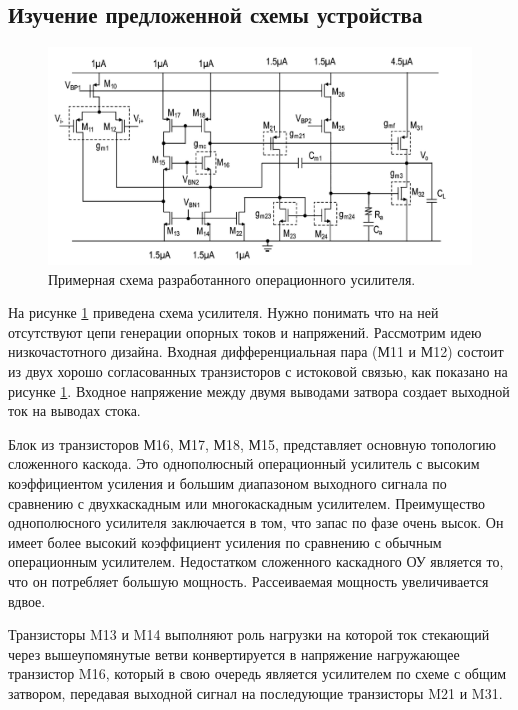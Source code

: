 \documentclass[a4paper,12pt]{article} %
\begin{document}



\subsection{Изучение предложенной схемы устройства}

\begin{figure}[]
    \centering
    \includegraphics[width=\textwidth]{opamp/sch.png}
    \caption{Примерная схема разработанного операционного усилителя.}
    \label{pic:op_amp}
\end{figure}


На рисунке \ref{pic:op_amp} приведена схема усилителя. Нужно понимать что на ней  отсутствуют цепи генерации опорных токов и напряжений. Рассмотрим идею низкочастотного дизайна.
Входная дифференциальная  пара (М11 и М12) состоит из двух хорошо согласованных транзисторов с истоковой связью, как показано на рисунке \ref{pic:op_amp}. Входное напряжение между двумя выводами затвора создает выходной ток на выводах стока. 

Блок из транзисторов М16, М17, М18, М15, представляет основную топологию сложенного каскода. Это однополюсный операционный усилитель с высоким коэффициентом усиления и большим диапазоном выходного сигнала по сравнению с двухкаскадным или многокаскадным усилителем. Преимущество однополюсного усилителя заключается в том, что запас по фазе очень высок. Он имеет более высокий коэффициент усиления по сравнению с обычным операционным усилителем. Недостатком сложенного каскадного ОУ является то, что он потребляет большую мощность. Рассеиваемая мощность увеличивается вдвое. 

Транзисторы M13 и M14 выполняют роль нагрузки на которой ток стекающий через вышеупомянутые ветви конвертируется в напряжение нагружающее транзистор M16, который в свою очередь является усилителем по схеме с общим затвором, передавая выходной сигнал на последующие транзисторы M21 и M31.
\end{document}
